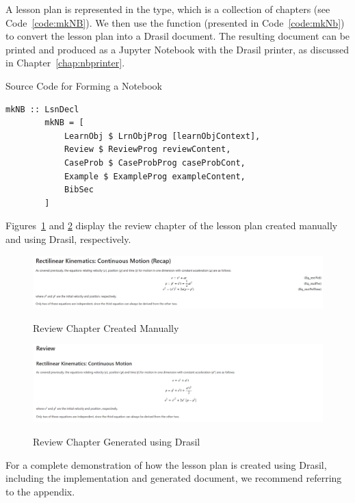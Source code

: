 A lesson plan is represented in the  type, which is a 
collection of chapters (see Code~\ref{code:mkNB}). We then use the 
 function (presented in Code~\ref{code:mkNb}) to convert the 
lesson plan into a Drasil document. The resulting document can be printed and 
produced as a Jupyter Notebook with the Drasil printer, as discussed in 
Chapter~\ref{chap:nbprinter}.

\begin{listing}[h!]
	\caption{Source Code for Forming a Notebook} 
	\label{code:mkNB}
	\begin{lstlisting}[language=haskell1]				
		mkNB :: LsnDecl
		mkNB = [
			LearnObj $ LrnObjProg [learnObjContext],
			Review $ ReviewProg reviewContent,
			CaseProb $ CaseProbProg caseProbCont,
			Example $ ExampleProg exampleContent,
			BibSec
		]
	\end{lstlisting}
\end{listing}

Figures~\ref{fig:review_byhand} and \ref{fig:review_drasil} display the 
review chapter of the lesson plan created manually and using Drasil, 
respectively.

\begin{figure}[h!]
	\caption{Review Chapter Created Manually}
	\includegraphics[width=1\textwidth]{figures/review_byhand.png}
	\label{fig:review_byhand}
\end{figure}

\begin{figure}[h!]
	\caption{Review Chapter Generated using Drasil}
	\includegraphics[width=1\textwidth]{figures/review_drasil.png}
	\label{fig:review_drasil}
\end{figure}

For a complete demonstration of how the lesson plan is created using Drasil, 
including the implementation and generated document, we recommend referring to 
the appendix. 
